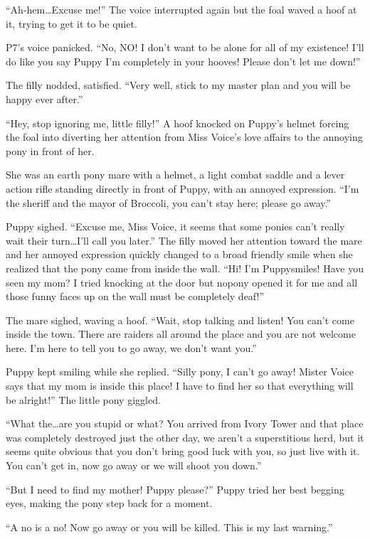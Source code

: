 ``Ah-hem\dots Excuse me!'' The voice interrupted again but the foal waved a hoof at it, trying to get it to be quiet.

P7's voice panicked. ``No, NO! I don't want to be alone for all of my existence! I'll do like you say Puppy I'm completely in your hooves! Please don't let me down!''

The filly nodded, satisfied. ``Very well, stick to my master plan and you will be happy ever after.''

``Hey, stop ignoring me, little filly!'' A hoof knocked on Puppy's helmet forcing the foal into diverting her attention from Miss Voice's love affairs to the annoying pony in front of her.

She was an earth pony mare with a helmet, a light combat saddle and a lever action rifle standing directly in front of Puppy, with an annoyed expression. ``I'm the sheriff and the mayor of Broccoli, you can't stay here; please go away.''

Puppy sighed. ``Excuse me, Miss Voice, it seems that some ponies can't really wait their turn\dots I'll call you later.'' The filly moved her attention toward the mare and her annoyed expression quickly changed to a broad friendly smile when she realized that the pony came from inside the wall. ``Hi! I'm Puppysmiles! Have you seen my mom? I tried knocking at the door but nopony opened it for me and all those funny faces up on the wall must be completely deaf!''

The mare sighed, waving a hoof. ``Wait, stop talking and listen! You can't come inside the town. There are raiders all around the place and you are not welcome here. I'm here to tell you to go away, we don't want you.''

Puppy kept smiling while she replied. ``Silly pony, I can't go away! Mister Voice says that my mom is inside this place! I have to find her so that everything will be alright!'' The little pony giggled.

``What the\dots are you stupid or what? You arrived from Ivory Tower and that place was completely destroyed just the other day, we aren't a superstitious herd, but it seems quite obvious that you don't bring good luck with you, so just live with it. You can't get in, now go away or we will shoot you down.''

``But I need to find my mother! Puppy please?'' Puppy tried her best begging eyes, making the pony step back for a moment.

``A no is a no! Now go away or you will be killed. This is my last warning.''

